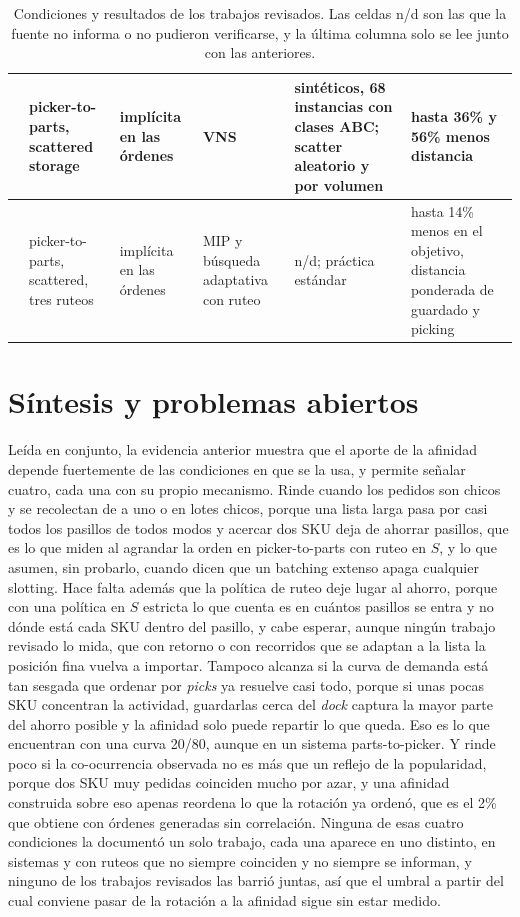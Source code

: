 \begin{table}[tp]
\begin{tabularx}{\textwidth}{|L|L|L|L|L|L|}
        \hline
        \citet{gamezalban2024scattered} & picker-to-parts, scattered storage & implícita en las órdenes & VNS & sintéticos, 68 instancias con clases ABC; scatter aleatorio y por volumen & hasta 36\% y 56\% menos distancia \\
        \hline
        \citet{chen2026integrated} & picker-to-parts, scattered, tres ruteos & implícita en las órdenes & MIP y búsqueda adaptativa con ruteo & n/d; práctica estándar & hasta 14\% menos en el objetivo, distancia ponderada de guardado y picking \\
        \hline
    \end{tabularx}
    \caption{Condiciones y resultados de los trabajos revisados. Las celdas n/d son las que la fuente no informa o no pudieron verificarse, y la última columna solo se lee junto con las anteriores.}
    \label{tab:estado-arte}
\end{table}

\section{Síntesis y problemas abiertos}
\label{sec:sintesis}

Leída en conjunto, la evidencia anterior muestra que el aporte de la afinidad depende fuertemente de las condiciones en que se la usa, y permite señalar cuatro, cada una con su propio mecanismo.
Rinde cuando los pedidos son chicos y se recolectan de a uno o en lotes chicos, porque una lista larga pasa por casi todos los pasillos de todos modos y acercar dos SKU deja de ahorrar pasillos, que es lo que \citet{xu2020dynamic} miden al agrandar la orden en picker-to-parts con ruteo en $S$, y lo que \citet{mantel2007order} asumen, sin probarlo, cuando dicen que un batching extenso apaga cualquier slotting.
Hace falta además que la política de ruteo deje lugar al ahorro, porque con una política en $S$ estricta lo que cuenta es en cuántos pasillos se entra y no dónde está cada SKU dentro del pasillo, y cabe esperar, aunque ningún trabajo revisado lo mida, que con retorno o con recorridos que se adaptan a la lista la posición fina vuelva a importar.
Tampoco alcanza si la curva de demanda está tan sesgada que ordenar por \emph{picks} ya resuelve casi todo, porque si unas pocas SKU concentran la actividad, guardarlas cerca del \emph{dock} captura la mayor parte del ahorro posible y la afinidad solo puede repartir lo que queda.
Eso es lo que \citet{mirzaei2021integrated} encuentran con una curva 20/80, aunque en un sistema parts-to-picker.
Y rinde poco si la co-ocurrencia observada no es más que un reflejo de la popularidad, porque dos SKU muy pedidas coinciden mucho por azar, y una afinidad construida sobre eso apenas reordena lo que la rotación ya ordenó, que es el 2\% que \citet{zhang2016correlated} obtiene con órdenes generadas sin correlación.
Ninguna de esas cuatro condiciones la documentó un solo trabajo, cada una aparece en uno distinto, en sistemas y con ruteos que no siempre coinciden y no siempre se informan, y ninguno de los trabajos revisados las barrió juntas, así que el umbral a partir del cual conviene pasar de la rotación a la afinidad sigue sin estar medido.

